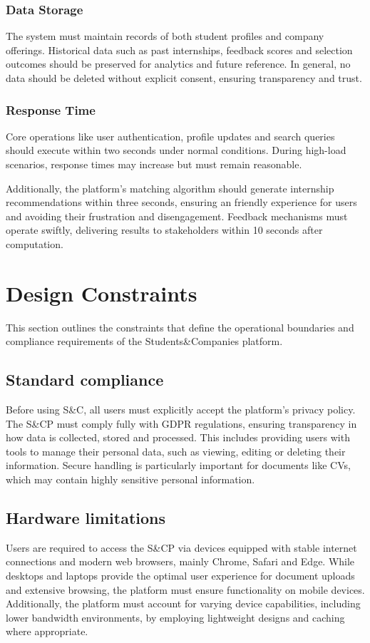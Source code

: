 \subsubsection{Data Storage}
The system must maintain records of both student profiles and company offerings.
Historical data such as past internships, feedback scores and selection outcomes should be preserved for analytics and future reference.
In general, no data should be deleted without explicit consent, ensuring transparency and trust.

\subsubsection{Response Time}
Core operations like user authentication, profile updates and search queries should execute within two seconds under normal conditions.
During high-load scenarios, response times may increase but must remain reasonable.

Additionally, the platform's matching algorithm should generate internship recommendations within three seconds, ensuring an friendly experience for users and avoiding their frustration and disengagement.
Feedback mechanisms must operate swiftly, delivering results to stakeholders within 10 seconds after computation.

\section{Design Constraints}
This section outlines the constraints that define the operational boundaries and compliance requirements of the Students\&Companies platform.

\subsection{Standard compliance}
Before using S\&C, all users must explicitly accept the platform's privacy policy.
The S\&CP must comply fully with GDPR regulations, ensuring transparency in how data is collected, stored and processed.
This includes providing users with tools to manage their personal data, such as viewing, editing or deleting their information.
Secure handling is particularly important for documents like CVs, which may contain highly sensitive personal information.

\subsection{Hardware limitations}
Users are required to access the S\&CP via devices equipped with stable internet connections and modern web browsers, mainly Chrome, Safari and Edge.
While desktops and laptops provide the optimal user experience for document uploads and extensive browsing, the platform must ensure functionality on mobile devices.
Additionally, the platform must account for varying device capabilities, including lower bandwidth environments, by employing lightweight designs and caching where appropriate.

